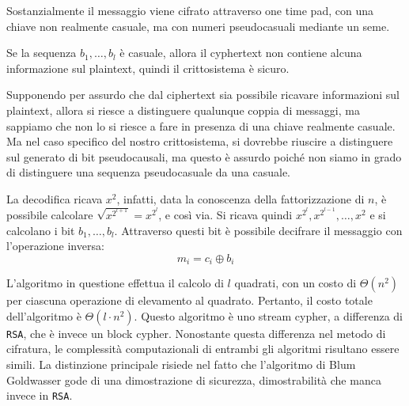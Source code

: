 Sostanzialmente il messaggio viene cifrato attraverso one time pad, 
con una chiave non realmente casuale, ma con numeri pseudocasuali mediante un seme.

Se la sequenza $b_1, \dots, b_l$ è casuale, allora il cyphertext non contiene 
alcuna informazione sul plaintext, quindi il crittosistema è sicuro.

Supponendo per assurdo che dal ciphertext sia possibile ricavare informazioni sul plaintext,
allora si riesce a distinguere qualunque coppia di messaggi, ma sappiamo che non lo si riesce a 
fare in presenza di una chiave realmente casuale. Ma nel caso specifico del nostro crittosistema, 
si dovrebbe riuscire a distinguere sul generato di bit pseudocausali, ma questo è assurdo 
poiché non siamo in grado di distinguere una sequenza pseudocasuale da una casuale.

La decodifica ricava $x^2$, infatti, data la conoscenza della fattorizzazione di $n$, 
è possibile calcolare $\sqrt{x^{2^{l+1}}} = x^{2^l}$, e così via. Si ricava quindi
$x^{2^l}, x^{2^{l-1}}, \dots, x^2$ e si calcolano i bit $b_1, \dots, b_l$. Attraverso 
questi bit è possibile decifrare il messaggio con l'operazione inversa:
\[
  m_i = c_i \oplus b_i
\]

L'algoritmo in questione effettua il calcolo di $l$ quadrati,
con un costo di $\Theta(n^2)$ per ciascuna operazione di elevamento
al quadrato. Pertanto, il costo totale dell'algoritmo è $\Theta(l \cdot n^2)$.
Questo algoritmo è uno stream cypher, a differenza di \texttt{RSA}, che è invece
un block cypher. Nonostante questa differenza nel metodo di cifratura, le complessità
computazionali di entrambi gli algoritmi risultano essere simili. La distinzione principale
risiede nel fatto che l'algoritmo di Blum Goldwasser gode di una dimostrazione di sicurezza,
dimostrabilità che manca invece in \texttt{RSA}.